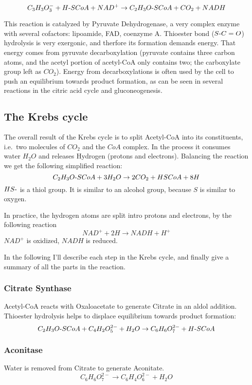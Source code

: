 \documentclass{article}
\def\mhyphen{{\hbox{-}}}
\begin{document}
\[
    C_3H_3O_3^- + H{\mhyphen}SCoA + NAD^+ \rightarrow
    C_2H_3O{\mhyphen}SCoA + CO_2 + NADH
\]

This reaction is catalyzed by Pyruvate Dehydrogenase, a very complex enzyme with several
cofactors: lipoamide, FAD, coenzyme A. Thioester bond ($S{\mhyphen}C=O$) hydrolysis is very exergonic,
and therfore its formation demands energy. That energy comes from pyruvate decarboxylation
(pyruvate contains three carbon atoms, and the acetyl portion of acetyl-CoA only contains
two; the carboxylate group left as $CO_2$). Energy from decarboxylations is often used by the
cell to push an equilibrium towards product formation, as can be seen in several reactions
in the citric acid cycle and gluconeogenesis.

\subsection{The Krebs cycle}
The overall result of the Krebs cycle is to split Acetyl-CoA into its constituents, i.e.\
two molecules of $CO_2$ and the $CoA$ complex. In the process it consumes water $H_2O$ and
releases Hydrogen (protons and electrons). Balancing the reaction we get the following
simplified reaction:
\[
    C_2H_3O{\mhyphen}SCoA + 3H_2O \rightarrow 2CO_2 + HSCoA + 8H
\]
$HS{\mhyphen}$ is a thiol group. It is similar to an alcohol group, because $S$ is similar to
oxygen.

In practice, the hydrogen atoms are split intro protons and electrons, by the following
reaction
\[
    NAD^+ + 2H \rightarrow NADH + H^+
\]
$NAD^+$ is oxidized, $NADH$ is reduced.

In the following I'll describe each step in the Krebs cycle, and finally give a summary of
all the parts in the reaction.

\subsubsection{Citrate Synthase}
Acetyl-CoA reacts with Oxaloacetate to generate Citrate in an aldol addition.
Thioester hydrolysis helps to displace equilibrium towards product formation:
\[
    C_2H_3O{\mhyphen}SCoA + C_4H_2O_5^{2-} + H_2O \rightarrow
    C_6H_6O_7^{2-} + H{\mhyphen}SCoA
\]

\subsubsection{Aconitase}
Water is removed from Citrate to generate Aconitate.
\[
    C_6H_6O_7^{2-} \rightarrow C_6H_4O_6^{2-} + H_2O
\]
\end{document}
